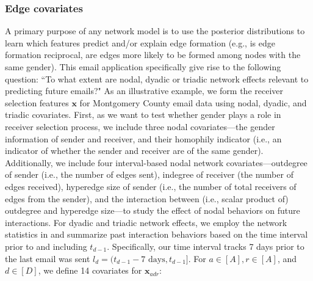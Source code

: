 \documentclass[ba]{imsart}
\numberwithin{equation}{section}
\theoremstyle{plain}
\begin{document}
	\subsubsection{Edge covariates}
	A primary purpose of any network model is to use the posterior distributions to learn which features predict and/or explain edge formation (e.g., is edge formation reciprocal, are edges more likely to be formed among nodes with the same gender). This email application specifically give rise to the following question: ``To what extent are nodal, dyadic or triadic network effects relevant to predicting future emails?" As an illustrative example, we form the receiver selection features $\boldsymbol{x}$ for Montgomery County email data using nodal, dyadic, and triadic covariates. First, as we want to test whether gender plays a role in receiver selection process, we include three nodal covariates---the gender information of sender and receiver, and their homophily indicator (i.e., an indicator of whether the sender and receiver are of the same gender).  Additionally, we include four interval-based nodal network covariates---outdegree of sender (i.e., the number of edges sent), indegree of receiver (the number of edges received), hyperedge size of sender (i.e., the number of total receivers of edges from the sender), and the interaction between (i.e., scalar product of) outdegree and hyperedge size---to study the effect of nodal behaviors on future interactions. For dyadic and triadic network effects, we employ the network statistics in \cite{PerryWolfe2012} and summarize past interaction behaviors based on the time interval prior to and including $t_{d-1}$. Specifically, our time interval tracks 7 days prior to the last email was sent $l_d = (t_{d-1}-7\mbox{ days}, t_{d-1}]$. For $a \in [A], r \in [A]$, and $d \in [D]$, we define 14 covariates for $\boldsymbol{x}_{adr}$:
\end{document}
